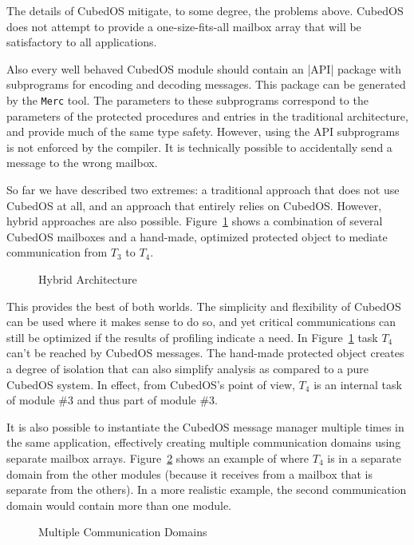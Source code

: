 The details of CubedOS mitigate, to some degree, the problems above. CubedOS does not attempt to provide a one-size-fits-all mailbox array that
will be satisfactory to all applications.

Also every well behaved CubedOS module should contain an |API| package with subprograms for
encoding and decoding messages. This package can be generated by the \texttt{Merc} tool. The
parameters to these subprograms correspond to the parameters of the protected procedures and
entries in the traditional architecture, and provide much of the same type safety. However,
using the API subprograms is not enforced by the compiler. It is technically possible to accidentally
send a message to the wrong mailbox.

So far we have described two extremes: a traditional approach that does not use CubedOS at all,
and an approach that entirely relies on CubedOS. However, hybrid approaches are also possible.
Figure~\ref{fig:hybrid-architecture} shows a combination of several CubedOS mailboxes and a
hand-made, optimized protected object to mediate communication from $T_3$ to $T_4$.

\begin{figure}[tbhp]
  \center
  \caption{Hybrid Architecture}
  \label{fig:hybrid-architecture}
\end{figure}

This provides the best of both worlds. The simplicity and flexibility of CubedOS can be used
where it makes sense to do so, and yet critical communications can still be optimized if the
results of profiling indicate a need. In Figure~\ref{fig:hybrid-architecture} task $T_4$ can't
be reached by CubedOS messages. The hand-made protected object creates a degree of isolation
that can also simplify analysis as compared to a pure CubedOS system. In effect, from CubedOS's
point of view, $T_4$ is an internal task of module \#3 and thus part of module \#3.

It is also possible to instantiate the CubedOS message manager multiple times in the same
application, effectively creating multiple communication domains using separate mailbox arrays.
Figure~\ref{fig:multi-domain} shows an example of where $T_4$ is in a separate domain from the
other modules (because it receives from a mailbox that is separate from the others). In a more
realistic example, the second communication domain would contain more than one module.

\begin{figure}[tbhp]
  \center
  \caption{Multiple Communication Domains}
  \label{fig:multi-domain}
\end{figure}

